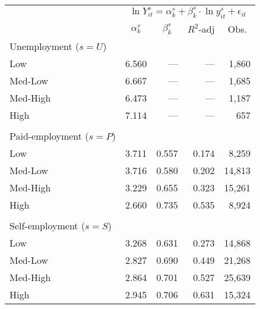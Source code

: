 \begin{tabular}{lrrrr}
\toprule
      & \multicolumn{4}{c}{$\ln Y_{it}^{s} = \alpha_k^s + \beta_k^s \cdot \ln y_{it}^{s} + \epsilon_{it}$} \\
\cmidrule{2-5}      & \multicolumn{1}{c}{ $\alpha_k^s$ } & \multicolumn{1}{c}{ $\beta_k^s$ } & \multicolumn{1}{c}{ $R^2$-adj } & \multicolumn{1}{c}{ Obs. } \\
\midrule
Unemployment ($s = U$) &       &       &       &  \\
\qquad Low & 6.560 & ---   & ---   &            1,860  \\
\qquad Med-Low & 6.667 & ---   & ---   &            1,685  \\
\qquad Med-High & 6.473 & ---   & ---   &            1,187  \\
\qquad High & 7.114 & ---   & ---   &                657  \\
      &       &       &       &  \\
Paid-employment ($s = P$) &       &       &       &  \\
\qquad Low & 3.711 & 0.557 & 0.174 &            8,259  \\
\qquad Med-Low & 3.716 & 0.580 & 0.202 &          14,813  \\
\qquad Med-High & 3.229 & 0.655 & 0.323 &          15,261  \\
\qquad High & 2.660 & 0.735 & 0.535 &            8,924  \\
      &       &       &       &  \\
Self-employment ($s = S$) &       &       &       &  \\
\qquad Low & 3.268 & 0.631 & 0.273 &          14,868  \\
\qquad Med-Low & 2.827 & 0.690 & 0.449 &          21,268  \\
\qquad Med-High & 2.864 & 0.701 & 0.527 &          25,639  \\
\qquad High & 2.945 & 0.706 & 0.631 &          15,324  \\
\bottomrule
\end{tabular}%
